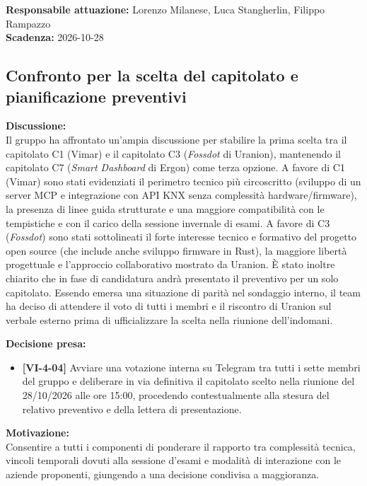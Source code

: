\documentclass[12pt,a4paper]{article}
\newcommand{\tightlist}{\setlength{\itemsep}{1pt}\setlength{\parskip}{0pt}}
\begin{document}
\textbf{Responsabile attuazione:} Lorenzo Milanese, Luca Stangherlin, Filippo Rampazzo \\
\textbf{Scadenza:} 2026-10-28

\hypertarget{argomento-4}{%
\subsection{Confronto per la scelta del capitolato e pianificazione preventivi}}

\textbf{Discussione:} \\
Il gruppo ha affrontato un'ampia discussione per stabilire la prima scelta tra il capitolato C1 (Vimar) e il capitolato C3 (\emph{Fossdot} di Uranion), mantenendo il capitolato C7 (\emph{Smart Dashboard} di Ergon) come terza opzione. A favore di C1 (Vimar) sono stati evidenziati il perimetro tecnico più circoscritto (sviluppo di un server MCP e integrazione con API KNX senza complessità hardware/firmware), la presenza di linee guida strutturate e una maggiore compatibilità con le tempistiche e con il carico della sessione invernale di esami. A favore di C3 (\emph{Fossdot}) sono stati sottolineati il forte interesse tecnico e formativo del progetto open source (che include anche sviluppo firmware in Rust), la maggiore libertà progettuale e l'approccio collaborativo mostrato da Uranion. È stato inoltre chiarito che in fase di candidatura andrà presentato il preventivo per un solo capitolato. Essendo emersa una situazione di parità nel sondaggio interno, il team ha deciso di attendere il voto di tutti i membri e il riscontro di Uranion sul verbale esterno prima di ufficializzare la scelta nella riunione dell'indomani.

\textbf{Decisione presa:}
\begin{itemize}
\tightlist
\item[$\checkmark$] \textbf{[VI-4-04]} Avviare una votazione interna su Telegram tra tutti i sette membri del gruppo e deliberare in via definitiva il capitolato scelto nella riunione del 28/10/2026 alle ore 15:00, procedendo contestualmente alla stesura del relativo preventivo e della lettera di presentazione.
\end{itemize}

\textbf{Motivazione:} \\
Consentire a tutti i componenti di ponderare il rapporto tra complessità tecnica, vincoli temporali dovuti alla sessione d'esami e modalità di interazione con le aziende proponenti, giungendo a una decisione condivisa a maggioranza.
\end{document}
